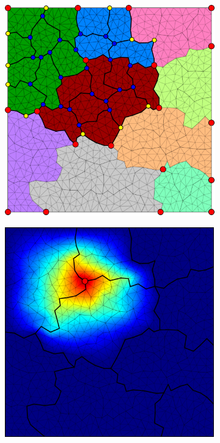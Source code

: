 \begin{figure}[htbp]
\begin{subfigure}[t]{0.3\textwidth}
  \end{subfigure}
  \hfill
  \begin{subfigure}[t]{0.3\textwidth}
    \centerline{\includegraphics[width=0.9\linewidth]{figs/square_tria_metis_node_ml_lvl2_grid}}
  \end{subfigure}
  \hfill
  \begin{subfigure}[t]{0.3\textwidth}
    \centerline{\includegraphics[width=0.9\linewidth]{figs/square_tria_metis_node_ml_lvl2_basis}}

\end{subfigure}
\end{figure}
